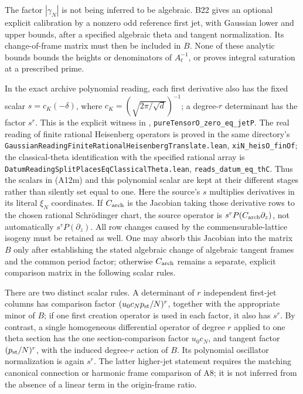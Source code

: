 \documentclass[11pt]{article}
\theoremstyle{definition}\newtheorem{definition}[theorem]{Definition}\newtheorem{remark}[theorem]{Remark}
\begin{document}
The factor $|\gamma_N|$ is not being inferred to be
algebraic.  B22 gives an optional explicit calibration
by a nonzero odd reference first jet, with Gaussian
lower and upper bounds, after a specified algebraic
theta and tangent normalization.  Its change-of-frame
matrix must then be included in $B$.  None of these
analytic bounds bounds the heights or denominators
of $A_t^{-1}$, or proves integral saturation at a
prescribed prime.

In the exact archive polynomial reading, each first
derivative also has the fixed scalar
$s=c_K(-\delta)$, where
$c_K=(\sqrt{2\pi/\sqrt d})^{-1}$; a degree-$r$
determinant has the factor $s^r$.  This is the
explicit witness in
,
\nolinkurl{pureTensorO_zero_eq_jetP}.
The real reading of finite rational Heisenberg operators
is proved in the same directory's
\nolinkurl{GaussianReadingFiniteRationalHeisenbergTranslate.lean},
\texttt{xiN\_heisO\_finOf}; the classical-theta identification
with the specified rational array is
\nolinkurl{DatumReadingSplitPlacesEqClassicalTheta.lean},
\texttt{reads\_datum\_eq\_thC}.
Thus the scalars in (A12m) and this polynomial scalar
are kept at their different stages rather than
silently set equal to one.
Here the source's $s$ multiplies derivatives in its
literal $\xi_N$ coordinates.  If $C_{\rm arch}$ is the
Jacobian taking those derivative rows to the chosen
rational Schr\"odinger chart, the source operator is
$s^rP(C_{\rm arch}\partial_z)$, not automatically
$s^rP(\partial_z)$.  All row changes caused by the
commensurable-lattice isogeny must be retained as well.
One may absorb this Jacobian into the matrix $B$ only
after establishing the stated algebraic change of
algebraic tangent frames and the common period factor;
otherwise $C_{\rm arch}$ remains a separate, explicit
comparison matrix in the following scalar rules.

There are two distinct scalar rules.  A determinant of
$r$ independent first-jet columns has comparison factor
$(u_0c_Np_{\rm st}/N)^r$, together with the appropriate
minor of $B$; if one first creation operator is used in
each factor, it also has $s^r$.  By contrast, a single
homogeneous differential operator of degree $r$ applied
to one theta section has the one section-comparison
factor $u_0c_N$, and tangent factor
$(p_{\rm st}/N)^r$, with the induced degree-$r$ action
of $B$.  Its polynomial oscillator normalization is
again $s^r$.  The latter higher-jet statement requires
the matching canonical connection or harmonic frame
comparison of A8; it is not inferred from the absence
of a linear term in the origin-frame ratio.
\end{document}
